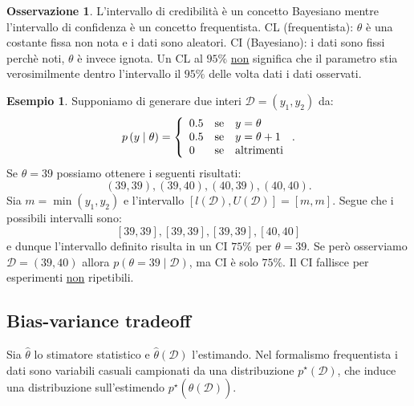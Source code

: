 \documentclass[10pt]{article}
\newcommand{\cond}{\mid}
\theoremstyle{definition}
\newtheorem{example}{Esempio}[section]
\newtheorem{observation}{Osservazione}[subsection]
\begin{document}
    \begin{observation}
        L'intervallo di credibilità è un concetto Bayesiano mentre l'intervallo di
        confidenza è un concetto frequentista. CL (frequentista): \( \theta \) è una costante fissa
        non nota e i dati sono aleatori. CI (Bayesiano): i dati sono fissi perchè noti,
        \( \theta \) è invece ignota. Un CL al \( 95\% \) \underline{non} significa che il
        parametro stia verosimilmente dentro l'intervallo il \( 95\% \) delle volta dati
        i dati osservati.
    \end{observation}

    \begin{example}
        Supponiamo di generare due interi \( \mathcal{D} = \left( y_1, y_2 \right) \) da:
        \[
            p \left( y\cond \theta \right) = \left\{
            \begin{array}{l@{\quad\text{se}\quad}l}
                0.5 & y = \theta \\
                0.5 & y = \theta + 1 \\
                0 & \text{altrimenti} \\
            \end{array}\right..
        \]
        Se \( \theta = 39 \) possiamo ottenere i seguenti risultati:
        \[
            \left( 39, 39 \right), \left( 39, 40 \right), \left( 40, 39 \right), \left( 40, 40 \right).
        \]
        Sia \( m = \min \left( y_1, y_2 \right) \) e l'intervallo
        \( \left[ l(\mathcal{D}), U(\mathcal{D}) \right] = [m, m] \). Segue che i possibili intervalli
        sono:
        \[
            [39, 39], [39, 39], [39, 39], [40, 40]
        \]
        e dunque l'intervallo definito risulta in un CI \( 75\% \) per \( \theta = 39\).
        Se però osserviamo \( \mathcal{D} = \left( 39, 40 \right) \) allora
        \( p \left( \theta=39 \cond \mathcal{D} \right) \), ma CI è solo \( 75\% \). Il CI fallisce per esperimenti
        \underline{non} ripetibili.
    \end{example}

\subsection{Bias-variance tradeoff}
    Sia \( \hat{\theta} \) lo stimatore statistico e \( \hat{\theta} \left( \mathcal{D} \right) \) l'estimando. Nel formalismo
    frequentista i dati sono variabili casuali campionati da una distribuzione
    \( p^\star \left( \mathcal{D} \right)\), che induce una distribuzione sull'estimendo
    \( p^\star \left( \hat{\theta} \left( \mathcal{D} \right) \right) \).
\end{document}
